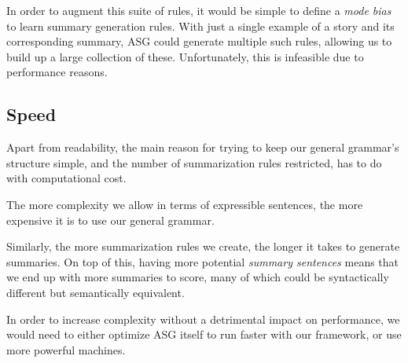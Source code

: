 In order to augment this suite of rules, it would be simple to define a \textit{mode bias} to learn summary generation rules. With just a single example of a story and its corresponding summary, ASG could generate multiple such rules, allowing us to build up a large collection of these. Unfortunately, this is infeasible due to performance reasons.

\subsection{Speed}

Apart from readability, the main reason for trying to keep our general grammar's structure simple, and the number of summarization rules restricted, has to do with computational cost.

The more complexity we allow in terms of expressible sentences, the more expensive it is to use our general grammar.

Similarly, the more summarization rules we create, the longer it takes to generate summaries. On top of this, having more potential \textit{summary sentences} means that we end up with more summaries to score, many of which could be syntactically different but semantically equivalent.

In order to increase complexity without a detrimental impact on performance, we would need to either optimize ASG itself to run faster with our framework, or use more powerful machines.